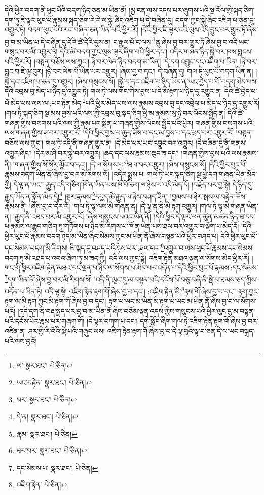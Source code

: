 དེའི་ཕྱིར་བདག་ནི་ཕུང་པོའི་བདག་ཉིད་ཅན་མ་ཡིན་ནོ། །མྱ་ངན་ལས་འདས་པར་ཞུགས་པའི་སྔ་རོལ་གྱི་སྐད་ཅིག་དག་ཏུ་ཇི་ལྟར་ཕུང་པོ་རྣམས་སྐད་ཅིག་རེ་རེ་ལ་སྐྱེ་ཞིང་འཇིག་པ་དེ་བཞིན་དུ། བདག་ཀྱང་སྐྱེ་ཞིང་འཇིག་པ་ཅན་དུ་འགྱུར་ཏེ། བདག་ཕུང་པོའི་རང་བཞིན་ཅན་ཡིན་པའི་ཕྱིར་རོ། །དེའི་ཕྱིར་ཇི་ལྟར་ངའི་ལུས་འདི་བྱུང་བར་གྱུར་ཏོ་ཞེས་བྱ་བ་མ་ཡིན་པ་དེ་བཞིན་དུ་དེའི་ཚེ་དེའི་དུས་ན། ང་རྒྱལ་པོ་ང་ལས་\footnote{ལ་  སྣར་ཐང་།  པེ་ཅིན། }ནུ་ཞེས་བྱ་བར་གྱུར་ཏོ་ཞེས་བྱ་བ་འདི་ཡང་གསུང་བར་མི་འགྱུར་ཏེ། དེའི་ཚེ་བདག་ཀྱང་ལུས་ལྟར་ཞིག་པའི་ཕྱིར་དང་། འདིར་གཞན་ཉིད་སྐྱེ་བར་ཁས་བླངས་པའི་ཕྱིར་རོ། །བསྟན་བཅོས་ལས་ཀྱང་། ཉེ་བར་ལེན་ཉིད་བདག་མ་ཡིན། །དེ་དག་འབྱུང་དང་འཇིག་པ་ཡིན། །ཉེ་བར་བླང་བ་ཇི་ལྟ་བུར། །ཉེ་བར་ལེན་པོ་ཡིན་པར་འགྱུར། །ཞེས་བྱ་བ་དང་། དེ་བཞིན་དུ། གལ་ཏེ་ཕུང་པོ་བདག་ཡིན་ན། །སྐྱེ་དང་འཇིག་པ་ཅན་དུ་འགྱུར། །ཞེས་གསུངས་སོ། །སྐྱེ་བ་དང་འཇིག་པ་ཉིད་ཡོད་ན་ཡང་བྱེད་པ་པོ་བདག་མེད་པས་དེའི་འབྲས་བུ་མེད་པ་ཉིད་དུ་འགྱུར་ཏེ། གལ་ཏེ་ལས་གང་གིས་བྱས་པ་དེ་མི་རྟག་པ་ཉིད་དུ་འགྱུར་ན། དེའི་ཚེ་བྱེད་པ་པོ་མེད་པས་ལས་ལ་:ཡང་རྟེན་མེད་\footnote{ཡང་བརྟེན་  སྣར་ཐང་།  པེ་ཅིན། }པའི་ཕྱིར་མེད་པས་ལས་རྣམས་འབྲས་བུ་དང་འབྲེལ་པ་མེད་པ་ཉིད་དུ་འགྱུར་རོ། །གལ་ཏེ་སྐད་ཅིག་སྔ་མས་བྱས་པའི་ལས་ཀྱི་འབྲས་བུ་སྐད་ཅིག་ཕྱི་མ་རྣམས་སུ་ཉེ་བར་ལོངས་སྤྱོད་ན། དེའི་ཚེ་གཞན་གྱིས་བསགས་པའི་ལས་ཀྱི་རྣམ་པར་སྨིན་པ་གཞན་གྱིས་ལོངས་སྤྱོད་པའི་ཕྱིར། གཞན་གྱིས་བསགས་པའི་ལས་གཞན་གྱིས་ཟ་བར་འགྱུར་རོ། །དེའི་ཕྱིར་བྱས་པ་ཆུད་ཟོས་པ་དང་མ་བྱས་པ་དང་ཕྲད་པར་འགྱུར་རོ། །བསྟན་བཅོས་ལས་ཀྱང་། གལ་ཏེ་འདི་ནི་གཞན་གྱུར་ན། །དེ་མེད་པར་ཡང་འབྱུང་བར་འགྱུར། །དེ་བཞིན་དུ་ནི་གནས་འགྱུར་ཞིང་། །དེར་མ་ཤི་བར་སྐྱེ་བར་འགྱུར། །ཆད་དང་ལས་རྣམས་ཆུད་ཟ་དང་། །གཞན་གྱིས་བྱས་པའི་ལས་རྣམས་ནི། །གཞན་གྱིས་སོ་སོར་མྱོང་བ་དང་། །དེ་ལ་སོགས་པ་\footnote{པར་  སྣར་ཐང་།  པེ་ཅིན། }ཐལ་བར་འགྱུར། །ཞེས་གསུངས་སོ། །དེའི་ཕྱིར་ཕུང་པོ་རྣམས་བདག་ཡིན་ནོ་ཞེས་བྱ་བར་མི་རིགས་སོ། །འདིར་སྨྲས་པ། གལ་ཏེ་ཡང་སྐད་ཅིག་སྔ་ཕྱི་དག་གཞན་ཡིན་མོད་ཀྱི། དེ་ལྟ་ན་ཡང་། རྒྱུད་འདི་གཅིག་ཁོ་ན་ཡིན་པས་ཁོ་བོ་ཅག་ལ་ཉེས་པ་འདི་མེད་དོ། །བརྗོད་པར་བྱ་སྟེ། དེ་ཉིད་དུ་རྒྱུད་ཡོད་ན་སྐྱོན་མེད་དེ།\footnote{དེ་ན།  སྣར་ཐང་།  པེ་ཅིན། } །སྔར་རྣམས་\footnote{རྣམ་  སྣར་ཐང་།  པེ་ཅིན། }དཔྱད་ཚེ་རྒྱུད་ལ་ཉེས་བཤད་ཟིན། །བྱམས་པ་ཉེར་སྦས་ལ་བརྟེན་ཆོས་རྣམས་ནི། །ཞེས་བྱ་བ་དེར་རོ། །གལ་ཏེ་ལྷ་ལས་མི་གཞན་ན། །དེ་ལྟ་ན་ནི་མི་རྟག་འགྱུར། །གལ་ཏེ་ལྷ་མི་གཞན་ཡིན་ན། །རྒྱུད་ནི་འཐད་པར་མི་འགྱུར་རོ། །ཞེས་གསུངས་པའང་ཡིན་ནོ། །དེའི་ཕྱིར་དེ་ལྟར་ཕན་ཚུན་མཚན་ཉིད་ཐ་དད་པ་རྣམས་ལ་རྒྱུད་གཅིག་ཏུ་གཏོགས་པ་ཉིད་མི་རིགས་པ་ཁོ་ན་ཡིན་པས་ཐལ་བར་འགྱུར་བ་ལྡོག་པ་མེད་དོ། །དེའི་ཕྱིར་ཕུང་པོ་རྣམས་བདག་ཉིད་མ་ཡིན་ཞིང་སེམས་ཀྱང་མ་ཡིན་ནོ་ཞེས་བསྟན་པའི་ཕྱིར་བཤད་པ། དེའི་ཕྱིར་ཕུང་པོ་དང་སེམས་བདག་མི་རིགས། ཇི་སྐད་དུ་བཤད་པའི་ཉེས་པར་:ཐལ་བར་\footnote{ཐར་བར་  སྣར་ཐང་།  པེ་ཅིན། }འགྱུར་བ་ལས་ཕུང་པོ་རྣམས་དང་སེམས་བདག་ཏུ་མི་འཐད་པ་འབའ་ཞིག་ཏུ་མ་ཟད་ཀྱི། འདི་ལས་ཀྱང་སྟེ། འཇིག་རྟེན་མཐའ་ལྡན་ལ་སོགས་མེད་ཕྱིར་རོ། །གང་གི་ཕྱིར་འཇིག་རྟེན་མཐའ་དང་ལྡན་པ་ཉིད་ལ་སོགས་པ་མེད་པར་འདོན་པ་དེའི་ཕྱིར་ཕུང་པོ་རྣམས་:དང་སེམས་\footnote{དང་སེམས་པ་  སྣར་ཐང་།  པེ་ཅིན། }དག་ཡིན་ནོ་ཞེས་བྱ་བར་མི་རིགས་སོ། །འདི་ནི་ལུང་དུ་མ་བསྟན་པའི་དངོས་པོ་བཅུ་བཞི་ནི་སྡེ་པ་ཐམས་ཅད་ཀྱིས་འདོན་པ་ཡིན་ཏེ། འདི་ལྟ་སྟེ། འཇིག་རྟེན་རྟག་གོ་ཞེས་བྱ་བ་དང་། :འཇིག་རྟེན་མི་\footnote{འཇིག་རྟེན་  པེ་ཅིན། }རྟག་གོ་ཞེས་བྱ་བ་དང་། རྟག་ཀྱང་རྟག་ལ་མི་རྟག་ཀྱང་མི་རྟག་གོ་ཞེས་བྱ་བ་དང་། རྟག་པ་ཡང་མ་ཡིན་མི་རྟག་པ་ཡང་མ་ཡིན་ནོ་ཞེས་བྱ་བ་ལ་སོགས་པའོ། །འདི་དག་ནི་བརྡ་སྤྲད་པར་བྱ་བ་མ་ཡིན་ནོ་ཞེས་བཅོམ་ལྡན་འདས་ཀྱིས་གསུངས་པའི་ཕྱིར་ལུང་དུ་མ་བསྟན་པའི་དངོས་པོར་རྣམ་པར་གཞག་གོ། །དེ་ལྟར་བཀག་པ་དང་། དགེ་སློང་ཞིག་གལ་ཏེ་འཇིག་རྟེན་རྟག་གོ་ཞེས་བྱ་བར་འཛིན་ན། ཤར་གྱི་རི་བོའི་སྡེ་པའི་གཞུང་ལས། འཇིག་རྟེན་རྟག་གོ་ཞེས་བྱ་བ་དེ་ལྟ་བུའི་ལྟ་བ་ཅན་དེ་ལ་ཡང་བསྐྲད་པའི་ལས་བྱའོ། 